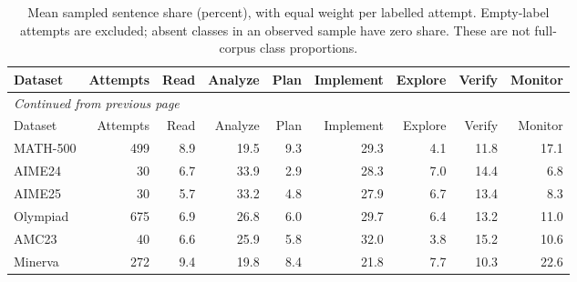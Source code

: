 \begingroup\scriptsize\setlength{\tabcolsep}{4pt}
\begin{longtable}{@{}lrrrrrrrr@{}}
\caption{Mean sampled sentence share (percent), with equal weight per labelled attempt. Empty-label attempts are excluded; absent classes in an observed sample have zero share. These are not full-corpus class proportions.}\label{tab:class-shares}\\
\toprule
Dataset & Attempts & Read & Analyze & Plan & Implement & Explore & Verify & Monitor \\
\midrule\endfirsthead
\multicolumn{9}{l}{\textit{Continued from previous page}}\\
\toprule
Dataset & Attempts & Read & Analyze & Plan & Implement & Explore & Verify & Monitor \\
\midrule\endhead
\bottomrule\endfoot
MATH-500 & 499 & 8.9 & 19.5 & 9.3 & 29.3 & 4.1 & 11.8 & 17.1 \\
AIME24 & 30 & 6.7 & 33.9 & 2.9 & 28.3 & 7.0 & 14.4 & 6.8 \\
AIME25 & 30 & 5.7 & 33.2 & 4.8 & 27.9 & 6.7 & 13.4 & 8.3 \\
Olympiad & 675 & 6.9 & 26.8 & 6.0 & 29.7 & 6.4 & 13.2 & 11.0 \\
AMC23 & 40 & 6.6 & 25.9 & 5.8 & 32.0 & 3.8 & 15.2 & 10.6 \\
Minerva & 272 & 9.4 & 19.8 & 8.4 & 21.8 & 7.7 & 10.3 & 22.6 \\
\end{longtable}\endgroup
